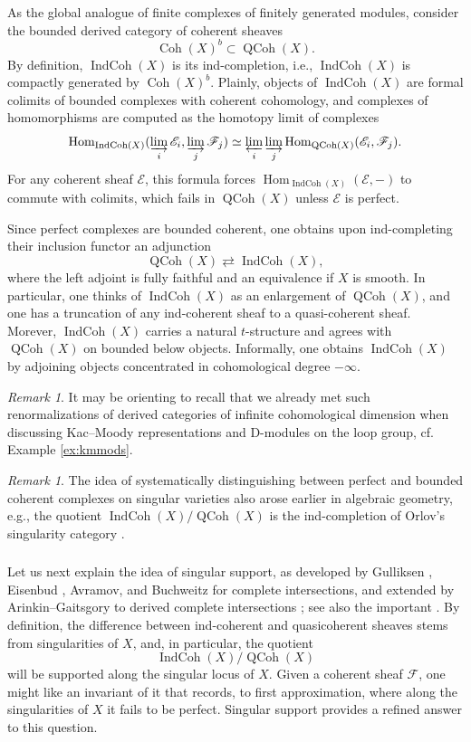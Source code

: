\documentclass[10pt]{amsart}
\newcommand{\IC}{\on{IndCoh}}
\newcommand{\on}{\operatorname}
\theoremstyle{remark}
\newtheorem{re}[subsubsection]{Remark}
\newcommand{\sE}{\mathscr{E}}
\newcommand{\Hom}{\operatorname{Hom}}
\newcommand{\sF}{\mathscr{F}}
\numberwithin{equation}{section}
\newcommand{\QCoh}{\on{QCoh}}
\begin{document}
As the global analogue of finite complexes of finitely generated modules, 
consider the bounded derived 
category of coherent sheaves$$\on{Coh}(X)^b \subset \QCoh(X).$$ By 
definition, 
$\on{IndCoh}(X)$ is its ind-completion, i.e., $\on{IndCoh}(X)$ is compactly generated by 
$\on{Coh}(X)^b$. Plainly, objects of $\on{IndCoh}(X)$ are formal 
colimits of bounded complexes with coherent cohomology, and complexes of  
homomorphisms are computed as the homotopy limit of complexes
%
\[
\Hom_{\on{IndCoh}(X)}( \varinjlim_i \sE_i, \varinjlim_j \sF_j) \simeq 
\varprojlim_i 
\varinjlim_j \Hom_{\on{QCoh}(X)}( \sE_i, \sF_j).
\]
% 
For any coherent sheaf $\sE$, this formula forces $\Hom_{\on{IndCoh}(X)}(\sE, -)$ to commute with colimits, which fails in $\QCoh(X)$ unless $\sE$ is perfect. 

Since perfect complexes are bounded coherent, one obtains upon ind-completing their inclusion functor an adjunction 
%
\[
\on{QCoh}(X) \rightleftarrows \on{IndCoh}(X), 
\]
%
where the left adjoint is fully faithful and an equivalence if $X$ is smooth. 
In particular, one thinks of $\on{IndCoh}(X)$ as an enlargement of 
$\on{QCoh}(X)$, and one has a truncation of any ind-coherent sheaf to a 
quasi-coherent sheaf. Morever, $\on{IndCoh}(X)$ carries a natural 
$t$-structure and agrees with $\on{QCoh}(X)$ on bounded below objects. 
Informally, one obtains $\on{IndCoh}(X)$ by adjoining objects concentrated in 
cohomological degree $-\infty$. 

\begin{re} It may be orienting to recall that we already met such renormalizations of derived categories of infinite cohomological dimension when discussing Kac--Moody representations and D-modules on the loop group, cf. Example \ref{ex:kmmods}. 
\end{re}



\begin{re} The idea of systematically distinguishing between perfect and bounded coherent complexes on singular varieties also arose earlier in algebraic geometry, e.g., the quotient $\on{IndCoh}(X)/\QCoh(X)$ is the ind-completion of Orlov's singularity category \cite{orlovsingularity}. 
\end{re}


\subsubsection{} Let us next explain the idea of singular support, as developed by  Gulliksen \cite{gulliksen}, Eisenbud \cite{eisenbud}, Avramov, and Buchweitz \cite{avramovbuchweitz} for complete intersections, and extended by Arinkin--Gaitsgory to derived complete intersections \cite{arinkingaitssingsupp}; see also the important \cite{bensoniyengarkrause}. By definition, the difference between ind-coherent and quasicoherent sheaves stems 
from singularities of $X$, and, in particular, the quotient $$\IC(X)/\QCoh(X)$$ 
will be supported along the singular locus of $X$. Given a coherent sheaf 
$\sF$, one might like an invariant of it that records, to first approximation, 
where along the singularities of $X$ it fails to be perfect. Singular 
support provides a refined answer to this question. 
\end{document}
